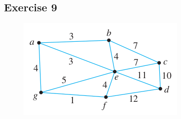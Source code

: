 \documentclass[14pt]{extarticle}
\begin{document}
\subsection{Exercise 9}
\begin{figure}[ht!]
    \centering
    \includegraphics[scale=0.5]{../images/10.6.9.png}
\end{figure}
\end{document}
